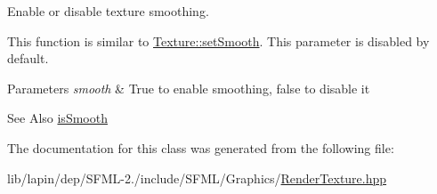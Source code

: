 Enable or disable texture smoothing. 

This function is similar to \hyperlink{classsf_1_1_texture_a0c3bd6825b9a99714f10d44179d74324}{Texture\-::set\-Smooth}. This parameter is disabled by default.


\begin{DoxyParams}{Parameters}
{\em smooth} & True to enable smoothing, false to disable it\\
\hline
\end{DoxyParams}
\begin{DoxySeeAlso}{See Also}
\hyperlink{classsf_1_1_render_texture_ae385f4f4dbd2af50fb11947bf0bcb83d}{is\-Smooth} 
\end{DoxySeeAlso}


The documentation for this class was generated from the following file\-:\begin{DoxyCompactItemize}
\item 
lib/lapin/dep/\-S\-F\-M\-L-\/2./include/\-S\-F\-M\-L/\-Graphics/\hyperlink{lapin_2dep_2_s_f_m_l-2_83_2include_2_s_f_m_l_2_graphics_2_render_texture_8hpp}{Render\-Texture.\-hpp}\end{DoxyCompactItemize}

